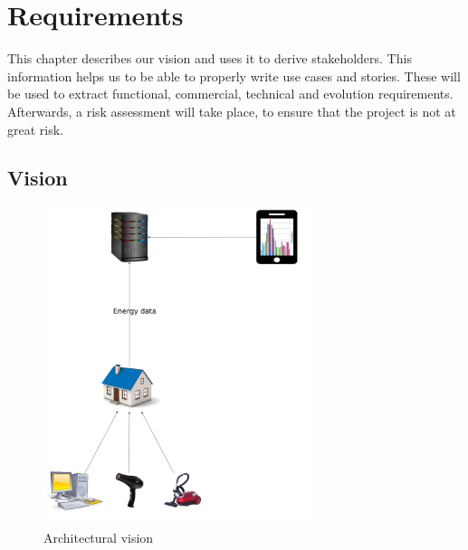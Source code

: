\chapter{Requirements}
\label{ch:requirements}
This chapter describes our vision and uses it to derive stakeholders. This information helps us to be able to properly write use cases and stories. These will be used to extract functional, commercial, technical and evolution requirements. Afterwards, a risk assessment will take place, to ensure that the project is not at great risk.

\section{Vision}

\begin{figure}[H]
	\centering
	\includegraphics[width=0.7\textwidth]{3-requirements/images/vision.jpg}
	\caption{Architectural vision}
	\label{fig:vision}
\end{figure}

%


















